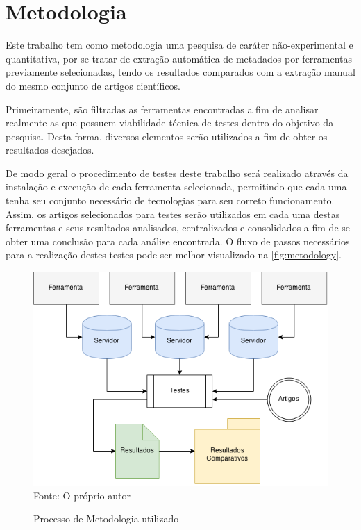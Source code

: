 
\chapter{Metodologia}
\label{cha:methodology}

Este trabalho tem como metodologia uma pesquisa de caráter não-experimental e quantitativa, por se tratar de extração automática de metadados por ferramentas previamente selecionadas, tendo os resultados comparados com a extração manual do mesmo conjunto de artigos científicos.


Primeiramente, são filtradas as ferramentas encontradas a fim de analisar realmente as que possuem viabilidade técnica de testes dentro do objetivo da pesquisa. Desta forma, diversos elementos serão utilizados a fim de obter os resultados desejados.


De modo geral o procedimento de testes deste trabalho será realizado através da instalação e execução de cada ferramenta selecionada, permitindo que cada uma tenha seu conjunto necessário de tecnologias para seu correto funcionamento. Assim, os artigos selecionados para testes serão utilizados em cada uma destas ferramentas e seus resultados analisados, centralizados e consolidados a fim de se obter uma conclusão para cada análise encontrada. O fluxo de passos necessários para a realização destes testes pode ser melhor visualizado na \autoref{fig:metodology}.

\begin{figure}
    \centering
    \caption{Processo de Metodologia utilizado}
    \label{fig:metodology}
    \includegraphics[width=0.8\linewidth]{./assets/images/metodology}
    \center\footnotesize{Fonte: O próprio autor}
\end{figure}


